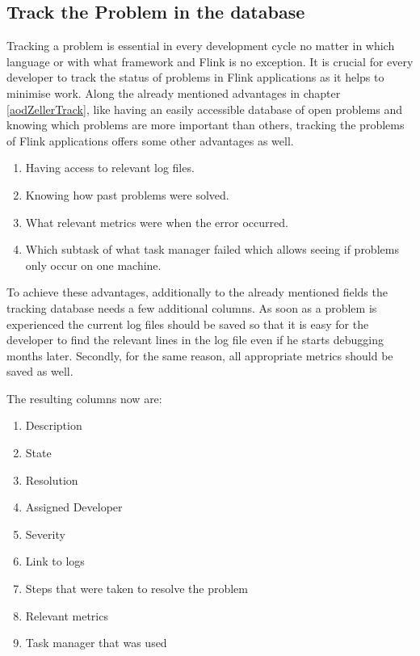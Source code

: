 \subsection{Track the Problem in the database}
Tracking a problem is essential in every development cycle no matter in which language or with what framework and Flink is no exception. It is crucial for every developer to track the status of problems in Flink applications as it helps to minimise work. Along the already mentioned advantages in chapter \ref{aodZellerTrack}, like having an easily accessible database of open problems and knowing which problems are more important than others, tracking the problems of Flink applications offers some other advantages as well.

\begin{enumerate}
  \item Having access to relevant log files.
  \item Knowing how past problems were solved.
  \item What relevant metrics were when the error occurred.
  \item Which subtask of what task manager failed which allows seeing if problems only occur on one machine.
\end{enumerate}

To achieve these advantages, additionally to the already mentioned fields the tracking database needs a few additional columns. As soon as a problem is experienced the current log files should be saved so that it is easy for the developer to find the relevant lines in the log file even if he starts debugging months later. Secondly, for the same reason, all appropriate metrics should be saved as well.

The resulting columns now are:

\begin{enumerate}
  \item Description
  \item State
  \item Resolution
  \item Assigned Developer
  \item Severity
  \item Link to logs
  \item Steps that were taken to resolve the problem
  \item Relevant metrics
  \item Task manager that was used
\end{enumerate}

